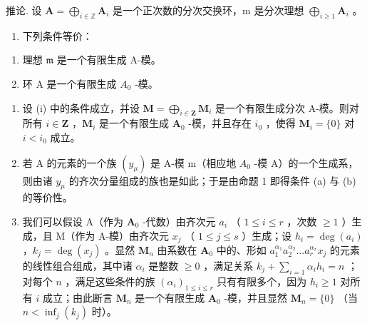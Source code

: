 推论. 设 \(\mathbf{A} = \bigoplus_{i\in \mathbb{Z}}\mathbf{A}_i\) 是一个正次数的分次交换环，m 是分次理想 \(\bigoplus_{i\geqslant 1}\mathbf{A}_i\) 。

\begin{enumerate}
\def\labelenumi{(\roman{enumi})}
\tightlist
\item
  下列条件等价：
\end{enumerate}

\begin{enumerate}
\def\labelenumi{(\alph{enumi})}
\item
  理想 \(\mathfrak{m}\) 是一个有限生成 A-模。
\item
  环 A 是一个有限生成 \(A_{0}\) -模。
\end{enumerate}

\begin{enumerate}
\def\labelenumi{(\roman{enumi})}
\setcounter{enumi}{1}
\item
  设 (i) 中的条件成立，并设 \(\mathbf{M} = \bigoplus_{i\in \mathbf{Z}}\mathbf{M}_i\) 是一个有限生成分次 A-模。则对所有 \(i\in \mathbf{Z}\) ，\(\mathbf{M}_i\) 是一个有限生成 \(\mathbf{A}_0\) -模，并且存在 \(i_0\) ，使得 \(\mathbf{M}_i = \{0\}\) 对 \(i < i_0\) 成立。
\item
  若 A 的元素的一个族 \((y_{\mu})\) 是 A-模 m（相应地 \(A_{0}\) -模 A）的一个生成系，则由诸 \(y_{\mu}\) 的齐次分量组成的族也是如此；于是由命题 1 即得条件 (a) 与 (b) 的等价性。
\item
  我们可以假设 A（作为 \(\mathbf{A}_0\) -代数）由齐次元 \(a_i\) （ \(1 \leqslant i \leqslant r\) ，次数 \(\geqslant 1\) ）生成，且 M（作为 A-模）由齐次元 \(x_j\) （ \(1 \leqslant j \leqslant s\) ）生成；设 \(h_i = \deg(a_i)\) ，\(k_j = \deg(x_j)\) 。显然 \(\mathbf{M}_n\) 由系数在 \(\mathbf{A}_0\) 中的、形如 \(a_1^{\alpha_1} a_2^{\alpha_2} \ldots a_r^{\alpha_r} x_j\) 的元素的线性组合组成，其中诸 \(\alpha_i\) 是整数 \(\geqslant 0\) ，满足关系 \(k_j + \sum_{i=1} \alpha_i h_i = n\) ；对每个 \(n\) ，满足这些条件的族 \((\alpha_i)_{1 \leqslant i \leqslant r}\) 只有有限多个，因为 \(h_i \geqslant 1\) 对所有 \(i\) 成立；由此断言 \(\mathbf{M}_n\) 是一个有限生成 \(\mathbf{A}_0\) -模，并且显然 \(\mathbf{M}_n = \{0\}\) （当 \(n < \inf_{j}(k_j)\) 时）。
\end{enumerate}

